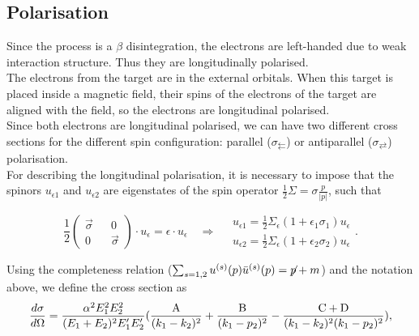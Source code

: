 \documentclass[10pt,swedish, openany]{book}
\begin{document}
\subsection{Polarisation}

Since the process is a $\beta$ disintegration, the electrons are left-handed due to weak interaction structure. Thus they are longitudinally polarised.\\

The electrons from the target are in the external orbitals. When this target is placed inside a magnetic field, their spins of the electrons of the target are aligned with the field, so the electrons are longitudinal polarised.\\

Since both electrons are longitudinal polarised, we can have two different cross sections for the different spin configuration: parallel ($\sigma_{\leftleftarrows}$) or antiparallel ($\sigma_{\rightleftarrows}$) polarisation.\\

For describing the longitudinal polarisation, it is necessary to impose that the spinors $u_{\epsilon1}$ and $u_{\epsilon2}$ are eigenstates of the spin operator $\frac{1}{2}\Sigma = \sigma \frac{p}{|p|}$, such that

\begin{equation}
\frac{1}{2}
   \begin{pmatrix}
   \vec{\sigma} && 0 \\
   0 && \vec{\sigma}
   \end{pmatrix} \cdot u_{\epsilon} = \epsilon \cdot u_{\epsilon} \quad \Rightarrow \quad \begin{matrix} u_{\epsilon 1} = \frac{1}{2} \Sigma_{\epsilon} (1+\epsilon_1 \sigma_1) u_{\epsilon}\\
   u_{\epsilon 2} = \frac{1}{2} \Sigma_{\epsilon} (1+\epsilon_2 \sigma_2) u_{\epsilon}
   \end{matrix}.
\end{equation}

Using the completeness relation ($\sum_{s=1,2} u^{(s)}(p) \bar{u}^{(s)}(p) =  \displaystyle{\not} p + m
$) and the notation above, we define the cross section as
\begin{equation}
    \frac{d\sigma}{d\Omega} = \frac{\alpha^2 E_1^2E_2^2}{(E_1+E_2)^2 E_1'E_2'} (\frac{\rm A}{(k_1 - k_2)^2} + \frac{\rm B}{(k_1 - p_2)^2} - \frac{\rm C+D}{(k_1 - k_2)^2(k_1 - p_2)^2}),
\end{equation}
\end{document}
